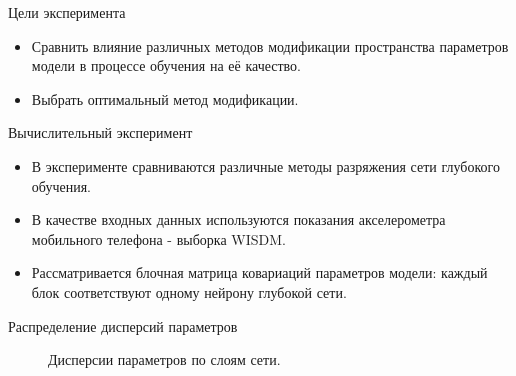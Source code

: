 \documentclass[10pt,pdf,russian]{beamer}
\begin{document}
\begin{frame}{Цели эксперимента}
\begin{itemize}
\item Сравнить влияние различных методов модификации пространства параметров модели в процессе обучения на её качество.
\item Выбрать оптимальный метод модификации.
\end{itemize}
\end{frame}

\begin{frame}{Вычислительный эксперимент}
\begin{itemize}
\item В эксперименте сравниваются различные методы разряжения сети глубокого обучения.
\item В качестве входных данных используются показания акселерометра мобильного телефона - выборка WISDM.
\item Рассматривается блочная матрица ковариаций параметров модели: каждый блок соответствуют одному нейрону глубокой сети.
\end{itemize}
\end{frame}

\begin{frame}{Распределение дисперсий параметров}
\begin{figure}[h]
\noindent{}
\caption{Дисперсии параметров по слоям сети.}
\label{fig_disp}
\end{figure}
\end{frame}
\end{document}
